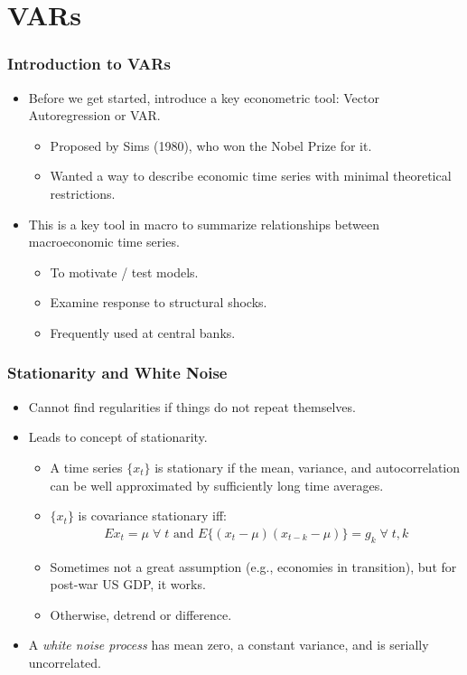 \documentclass[english,xcolor=svgnames]{beamer}
\begin{document}
\section{VARs}

\begin{frame}
\frametitle{Introduction to VARs}
\begin{itemize}
\item Before we get started, introduce a key econometric tool: Vector Autoregression or VAR.	
	\begin{itemize}
	\item Proposed by Sims (1980), who won the Nobel Prize for it.
	\item Wanted a way to describe economic time series with minimal theoretical restrictions.
	\end{itemize}
	\item This is a key tool in macro to summarize relationships between macroeconomic time series.
	\begin{itemize}
	\item To motivate / test models.
	\item Examine response to structural shocks.
	\item Frequently used at central banks.
	\end{itemize}
\end{itemize}
\end{frame}


\begin{frame}
\frametitle{Stationarity and White Noise}
\begin{itemize}
	\item Cannot find regularities if things do not repeat themselves.
	\item Leads to concept of stationarity.
\begin{itemize}
	\item A time series $\{x_t\}$ is stationary if the mean, variance, and autocorrelation can be well approximated by sufficiently long time averages.
	\item $\{x_t\}$ is covariance stationary iff:
	\begin{align*}
		E{x_t}=\mu\;\forall\;t\text{ and }E\{(x_t-\mu)(x_{t-k}-\mu)\}=g_k\;\forall\;t,k
	\end{align*}
	\item Sometimes not a great assumption (e.g., economies in transition), but for post-war US GDP, it works.
	\item Otherwise, detrend or difference.
	\end{itemize}
	\item A \emph{white noise process} has mean zero, a constant variance, and is serially uncorrelated.
\end{itemize}
\end{frame}
\end{document}
